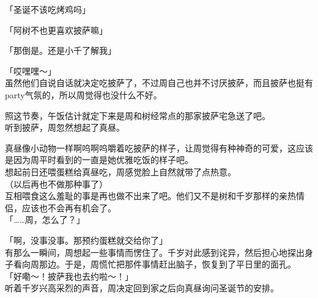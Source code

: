 「圣诞不该吃烤鸡吗」

「阿树不也更喜欢披萨嘛」

「那倒是。还是小千了解我」

「哎嘿嘿～」\\

虽然他们自说自话就决定吃披萨了，不过周自己也并不讨厌披萨，而且披萨也挺有party气氛的，所以周觉得也没什么不好。

照这节奏，午饭估计就定下来是周和树经常点的那家披萨宅急送了吧。\\

听到披萨，周忽然想起了真昼。

真昼像小动物一样啊呜啊呜嚼着吃披萨的样子，让周觉得有种神奇的可爱，这应该是因为周平时看到的一直是她优雅吃饭的样子吧。\\

想起前日还喂蛋糕给真昼吃，周感觉脸上自然就带了点热意。\\

（以后再也不做那种事了）\\

互相喂食这么羞耻的事是再也做不出来了吧。他们又不是树和千岁那样的亲热情侣，应该也不会再有机会了。\\

「……周，怎么了？」

「啊，没事没事。那预约蛋糕就交给你了」\\

有那么一瞬间，周想起一些事情而愣住了。千岁对此感到诧异，然后担心地探出身子看向周那边。于是，周慌忙把那件事情赶出脑子，恢复到了平日里的面孔。\\

「好嘞～！披萨我也去约啦～！」\\

听着千岁兴高采烈的声音，周决定回到家之后向真昼询问圣诞节的安排。
